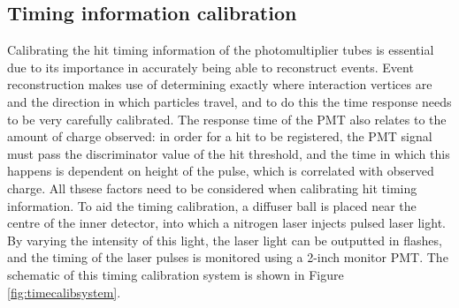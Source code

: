 \subsection{Timing information calibration}
Calibrating the hit timing information of the photomultiplier tubes is essential due to its importance in accurately being able to reconstruct events. Event reconstruction makes use of determining exactly where interaction vertices are and the direction in which particles travel, and to do this the time response needs to be very carefully calibrated. The response time of the PMT also relates to the amount of charge observed: in order for a hit to be registered, the PMT signal must pass the discriminator value of the hit threshold, and the time in which this happens is dependent on height of the pulse, which is correlated with observed charge. All thsese factors need to be considered when calibrating hit timing information.
\newline
To aid the timing calibration, a diffuser ball is placed near the centre of the inner detector, into which a nitrogen laser injects pulsed laser light. By varying the intensity of this light, the laser light can be outputted in flashes, and the timing of the laser pulses is monitored using a 2-inch monitor PMT. The schematic of this timing calibration system is shown in Figure \ref{fig:timecalibsystem}.

